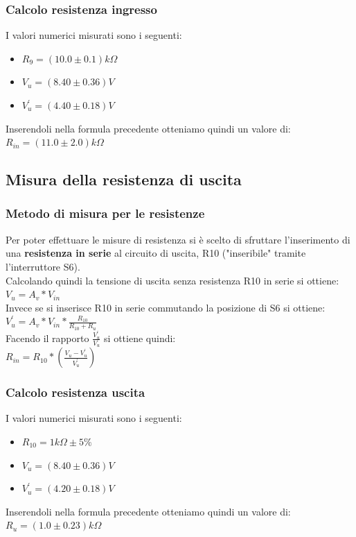 \documentclass{article}
\begin{document}
\subsubsection{Calcolo resistenza ingresso}
I valori numerici misurati sono i seguenti:
\begin{itemize}
	\item \large $R_{9} = (10.0 \pm 0.1)k\Omega$
	\item \large $V_{u} = (8.40 \pm 0.36)V$
	\item \large $V_{u}^{'} = (4.40 \pm 0.18)V$
\end{itemize}
Inserendoli nella formula precedente otteniamo quindi un valore di: \\ \large $R_{in} = (11.0 \pm 2.0)k\Omega$

\subsection{Misura della resistenza di uscita}
\subsubsection{Metodo di misura per le resistenze}
\normalsize Per poter effettuare le misure di resistenza si è scelto di sfruttare l'inserimento di una \textbf{resistenza in serie} al circuito di uscita, R10 ("inseribile" tramite l'interruttore S6).\\Calcolando quindi la tensione di uscita senza resistenza R10 in serie si ottiene:\\
\large $V_{u} = A_{v} * V_{in}$ \normalsize \\ Invece se si inserisce R10 in serie commutando la posizione di S6 si ottiene:\\
\large $ V_{u}^{'} = A_{v} * V_{in} * \frac{R_{10}}{R_{10} + R_u} $ \normalsize \\ Facendo il rapporto \large $\frac{V_{u}^{'}}{{V_u}}$ \normalsize si ottiene quindi: \\ \large $R_{in} = R_{10} * (\frac{V_{u}-V_{u}^{'}}{V_{u}^{'}}) $ \normalsize
\subsubsection{Calcolo resistenza uscita}
I valori numerici misurati sono i seguenti:
\begin{itemize}
	\item \large $R_{10} = 1k\Omega \pm 5\%$
	\item \large $V_{u} = (8.40 \pm 0.36)V$
	\item \large $V_{u}^{'} = (4.20 \pm 0.18)V$
\end{itemize}
Inserendoli nella formula precedente otteniamo quindi un valore di: \\ \large $R_{u} = (1.0 \pm 0.23)k\Omega$
\end{document}
